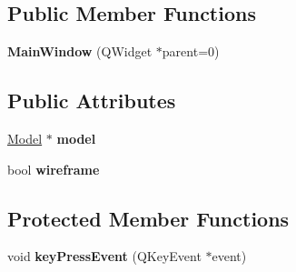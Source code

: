 \subsection*{Public Member Functions}
\begin{DoxyCompactItemize}
\item 
\mbox{\label{class_main_window_a8b244be8b7b7db1b08de2a2acb9409db}} 
{\bfseries Main\+Window} (Q\+Widget $\ast$parent=0)
\end{DoxyCompactItemize}
\subsection*{Public Attributes}
\begin{DoxyCompactItemize}
\item 
\mbox{\label{class_main_window_a6ceb394c6a471fb60dce6bd3f7c78475}} 
\mbox{\hyperlink{class_model}{Model}} $\ast$ {\bfseries model}
\item 
\mbox{\label{class_main_window_aa63776c884a82936064be5aabe3da6e8}} 
bool {\bfseries wireframe}
\end{DoxyCompactItemize}
\subsection*{Protected Member Functions}
\begin{DoxyCompactItemize}
\item 
\mbox{\label{class_main_window_a9c4f542263838b9ecd06eae839a42a34}} 
void {\bfseries key\+Press\+Event} (Q\+Key\+Event $\ast$event)
\end{DoxyCompactItemize}
